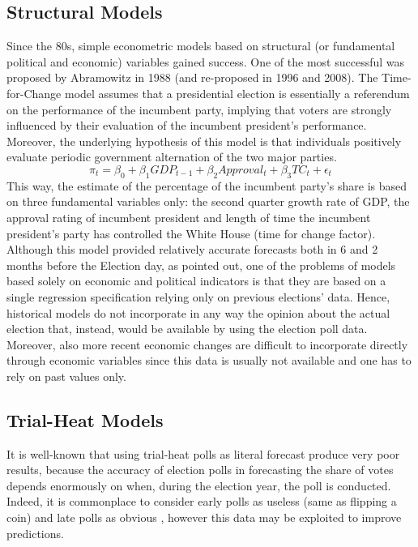 \documentclass[
  12pt]{article}
\begin{document}
\hypertarget{structural-models}{%
\subsection{Structural Models}\label{structural-models}}

Since the 80s, simple econometric models based on structural (or
fundamental political and economic) variables gained success. One of the
most successful was proposed by Abramowitz in 1988 (and re-proposed in
1996 and 2008). The Time-for-Change model \citep{abr:2008} assumes that
a presidential election is essentially a referendum on the performance
of the incumbent party, implying that voters are strongly influenced by
their evaluation of the incumbent president's performance. Moreover, the
underlying hypothesis of this model is that individuals positively
evaluate periodic government alternation of the two major parties.
\[\pi_t = \beta_0 + \beta_1 GDP_{t-1} + \beta_2 Approval_t + \beta_3 TC_t + \epsilon_t\]
This way, the estimate of the percentage of the incumbent party's share
is based on three fundamental variables only: the second quarter growth
rate of GDP, the approval rating of incumbent president and length of
time the incumbent president's party has controlled the White House
(time for change factor). Although this model provided relatively
accurate forecasts both in 6 and 2 months before the Election day, as
\citet{gel:kin:1993} pointed out, one of the problems of models based
solely on economic and political indicators is that they are based on a
single regression specification relying only on previous elections'
data. Hence, historical models do not incorporate in any way the opinion
about the actual election that, instead, would be available by using the
election poll data. Moreover, also more recent economic changes are
difficult to incorporate directly through economic variables since this
data is usually not available and one has to rely on past values only.

\hypertarget{trial-heat-models}{%
\subsection{Trial-Heat Models}\label{trial-heat-models}}

It is well-known that using trial-heat polls as literal forecast produce
very poor results, because the accuracy of election polls in forecasting
the share of votes depends enormously on when, during the election year,
the poll is conducted. Indeed, it is commonplace to consider early polls
as useless (same as flipping a coin) and late polls as obvious
\citep{cam:1996}, however this data may be exploited to improve
predictions.
\end{document}
